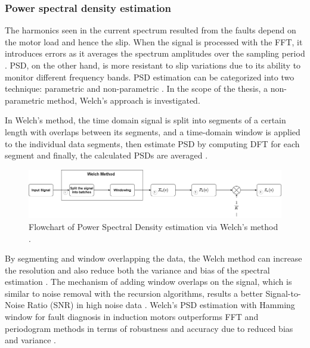 \subsubsection{Power spectral density estimation}

The harmonics seen in the current spectrum resulted from the faults depend on the motor load and hence the slip. When the signal is processed with the FFT, it introduces errors as it averages the spectrum amplitudes over the sampling period \cite{cusidocusido2008fault,irvine2002introduction}. PSD, on the other hand, is more resistant to slip variations due to its ability to monitor different frequency bands. PSD estimation can be categorized into two technique: parametric and non-parametric \cite{zerdani2020inter,heydarzadeh2016gearbox}. In the scope of the thesis, a non-parametric method, Welch's approach is investigated.

In Welch's method, the time domain signal is split into segments of a certain length with overlaps between its segments, and a time-domain window is applied to the individual data segments, then estimate PSD by computing DFT for each segment and finally, the calculated PSDs are averaged \cite{jwo2021windowing,stoica2005spectral,schmid2012use}.

\begin{figure}[h]
	\centering
	\includegraphics[width=400pt,keepaspectratio=true]{./fig/welchdiagram.png}
	\caption{Flowchart of Power Spectral Density estimation via Welch's method \cite{jwo2021windowing}.}	
	\label{welchdiagram}
\end{figure}

By segmenting and window overlapping the data, the Welch method can increase the resolution and also reduce both the variance and bias of the spectral estimation \cite{stoica2005spectral,al2010advanced,zerdani2020inter}. The mechanism of adding window overlaps on the signal, which is similar to noise removal with the recursion algorithms, results a better Signal-to-Noise Ratio (SNR) in high noise data \cite{jwo2021windowing,jin2020intelligent,irvine2002introduction}. Welch's PSD estimation with Hamming window for fault diagnosis in induction motors outperforms FFT and periodogram methods in terms of robustness and accuracy due to reduced bias and variance \cite{ayhan2003case}.

